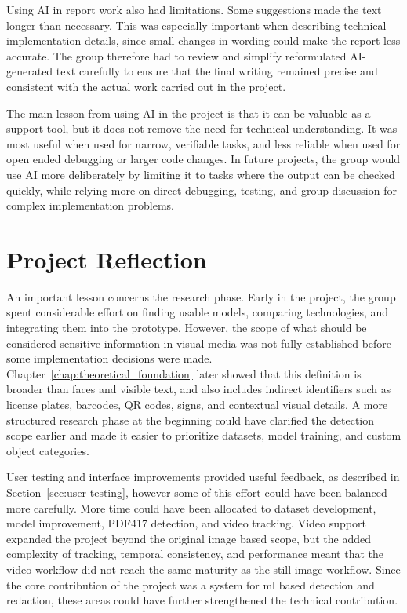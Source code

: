 Using AI in report work also had limitations. Some suggestions made the text longer than necessary. This was especially important when describing technical implementation details, since small changes in wording could make the report less accurate. The group therefore had to review and simplify reformulated AI-generated text carefully to ensure that the final writing remained precise and consistent with the actual work carried out in the project.

The main lesson from using AI in the project is that it can be valuable as a support tool, but it does not remove the need for technical understanding. It was most useful when used for narrow, verifiable tasks, and less reliable when used for open ended debugging or larger code changes. In future projects, the group would use AI more deliberately by limiting it to tasks where the output can be checked quickly, while relying more on direct debugging, testing, and group discussion for complex implementation problems.


\section{Project Reflection}

An important lesson concerns the research phase. Early in the project, the group spent considerable effort on finding usable models, comparing technologies, and integrating them into the prototype. However, the scope of what should be considered sensitive information in visual media was not fully established before some implementation decisions were made. Chapter~\ref{chap:theoretical_foundation} later showed that this definition is broader than faces and visible text, and also includes indirect identifiers such as license plates, barcodes, QR codes, signs, and contextual visual details. A more structured research phase at the beginning could have clarified the detection scope earlier and made it easier to prioritize datasets, model training, and custom object categories.

User testing and interface improvements provided useful feedback, as described in Section~\ref{sec:user-testing}, however some of this effort could have been balanced more carefully. More time could have been allocated to dataset development, model improvement, PDF417 detection, and video tracking. Video support expanded the project beyond the original image based scope, but the added complexity of tracking, temporal consistency, and performance meant that the video workflow did not reach the same maturity as the still image workflow. Since the core contribution of the project was a system for \acrshort{ml} based detection and redaction, these areas could have further strengthened the technical contribution.

